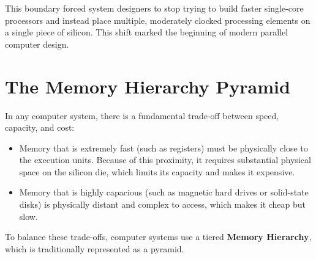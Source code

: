 \documentclass[12pt,a4paper,openany]{book}
\begin{document}
This boundary forced system designers to stop trying to build faster single-core processors and instead place multiple, moderately clocked processing elements on a single piece of silicon. This shift marked the beginning of modern parallel computer design.

\section{The Memory Hierarchy Pyramid}
In any computer system, there is a fundamental trade-off between speed, capacity, and cost:
\begin{itemize}
    \item Memory that is extremely fast (such as registers) must be physically close to the execution units. Because of this proximity, it requires substantial physical space on the silicon die, which limits its capacity and makes it expensive.
    \item Memory that is highly capacious (such as magnetic hard drives or solid-state disks) is physically distant and complex to access, which makes it cheap but slow.
\end{itemize}

To balance these trade-offs, computer systems use a tiered \textbf{Memory Hierarchy}, which is traditionally represented as a pyramid.
\end{document}
